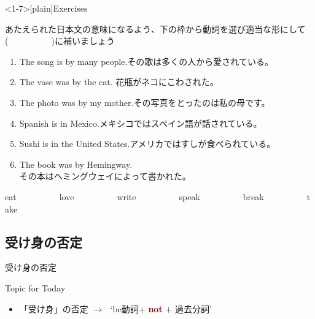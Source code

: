 \documentclass[aspectratio=169,xcolor={dvipsnames,table}]{beamer}
\newcommand{\myaudio}[1]{\href{#1}{\faVolumeUp}}
\begin{document}
\begin{frame}<1-7>[plain]{Exercises}

あたえられた日本文の意味になるよう、下の枠から動詞を選び適当な形にして(~~~~~~~~~~)に補いましょう\hfill\myaudio{./audio/051_passive_05.mp3}

\begin{enumerate}
 \item The song is  by many people.その歌は多くの人から愛されている。
 \item The vase was  by the cat. 花瓶がネコにこわされた。
 \item The photo was  by my mother.その写真をとったのは私の母です。
 \item Spanish is  in Mexico.メキシコではスペイン語が話されている。
 \item Sushi is  in the United States.アメリカではすしが食べられている。
 \item The book was  by Hemingway. \\その本はヘミングウェイによって書かれた。
\end{enumerate}

\begin{tcolorbox}\centering
 eat~~~~~~~~~~love~~~~~~~~~~write~~~~~~~~~~speak~~~~~~~~~~break~~~~~~~~~~take
\end{tcolorbox}
\end{frame}


\subsection{受け身の否定}
\begin{frame}[plain]{受け身の否定}
\Large

\hfill{}


\vfill

\hfill\myaudio{./audio/051_passive_06.mp3}

\begin{exampleblock}{Topic for Today}
\begin{itemize}[square]\small
 \item 「受け身」の否定 $\longrightarrow$\,\,\,\,`be動詞$+$ \textcolor{Maroon}{{\bfseries not}} $+$ 過去分詞'
\end{itemize}
     \end{exampleblock}

\end{frame}
\end{document}
